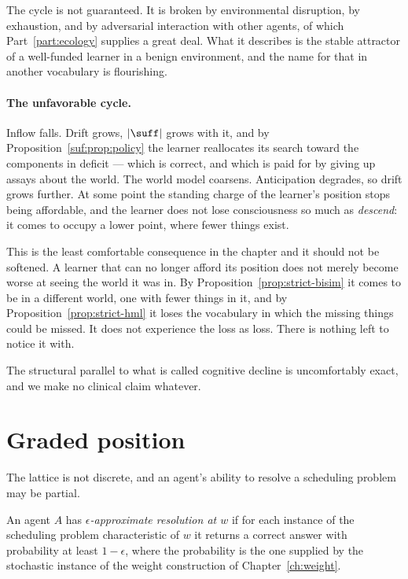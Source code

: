 \begin{remark}
The cycle is not guaranteed.
It is broken by environmental disruption, by exhaustion, and by
adversarial interaction with other agents, of which
Part~\ref{part:ecology} supplies a great deal.
What it describes is the stable attractor of a well-funded learner in a
benign environment, and the name for that in another vocabulary is
flourishing.
\end{remark}

\paragraph{The unfavorable cycle.}
Inflow falls.
Drift grows, $|\suff|$ grows with it, and by
Proposition~\ref{suf:prop:policy} the learner reallocates its search
toward the components in deficit --- which is correct, and which is
paid for by giving up assays about the world.
The world model coarsens.
Anticipation degrades, so drift grows further.
At some point the standing charge of the learner's position stops being
affordable, and the learner does not lose consciousness so much as
\emph{descend}: it comes to occupy a lower point, where fewer things
exist.

\begin{remark}
\label{rmk:descent}
This is the least comfortable consequence in the chapter and it should
not be softened.
A learner that can no longer afford its position does not merely become
worse at seeing the world it was in.
By Proposition~\ref{prop:strict-bisim} it comes to be in a different
world, one with fewer things in it, and by
Proposition~\ref{prop:strict-hml} it loses the vocabulary in which the
missing things could be missed.
It does not experience the loss as loss.
There is nothing left to notice it with.

The structural parallel to what is called cognitive decline is
uncomfortably exact, and we make no clinical claim whatever.
\end{remark}

\section{Graded position}

The lattice is not discrete, and an agent's ability to resolve a
scheduling problem may be partial.

\begin{definition}
\label{def:approx}
An agent $A$ has \emph{$\epsilon$-approximate resolution at $w$} if for
each instance of the scheduling problem characteristic of $w$ it returns
a correct answer with probability at least $1-\epsilon$, where the
probability is the one supplied by the stochastic instance of the weight
construction of Chapter~\ref{ch:weight}.
\end{definition}

